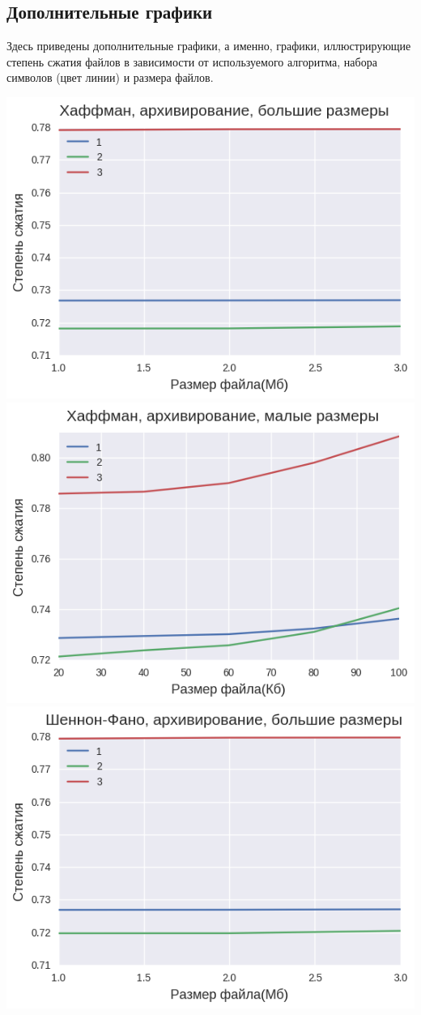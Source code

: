\documentclass[russian, a4paper, 12pt]{article}
\begin{document}
\subsection{Дополнительные графики}
Здесь приведены дополнительные графики, а именно, графики, иллюстрирующие степень сжатия файлов
в зависимости от используемого алгоритма, набора символов (цвет линии) и размера файлов.

\includegraphics[width=0.9\linewidth]{./plots/additional/haff_arc_big.png}\\
\includegraphics[width=0.9\linewidth]{./plots/additional/haff_arc_small.png}\\
\includegraphics[width=0.9\linewidth]{./plots/additional/shan_arc_big.png}\\
\end{document}

